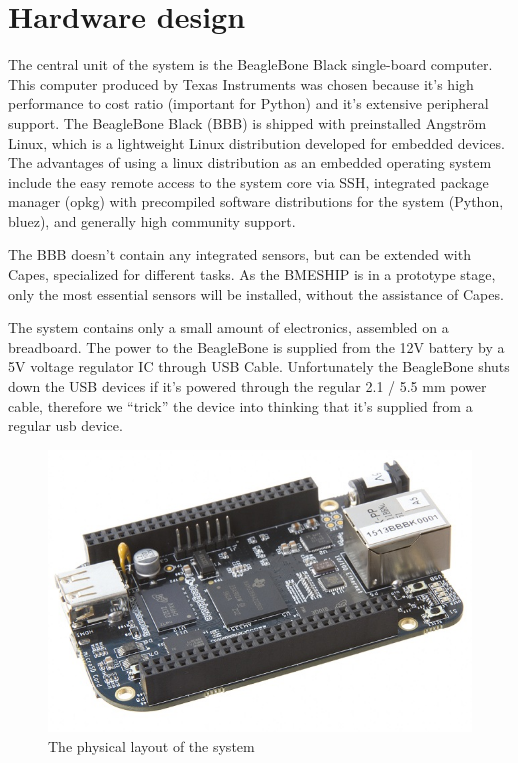 \section{Hardware design}

The central unit of the system is the BeagleBone Black single-board computer. This computer produced by Texas Instruments was chosen because it's high performance to cost ratio (important for Python) and it's extensive peripheral support.
The BeagleBone Black (BBB) is shipped with preinstalled Angström Linux, which is a lightweight Linux distribution developed for embedded devices. The advantages of using a linux distribution as an embedded operating system include the easy remote access to the system core via SSH, integrated package manager (opkg) with precompiled software distributions for the system (Python, bluez), and generally high community support.

The BBB doesn't contain any integrated sensors, but can be extended with Capes, specialized for different tasks. As the BMESHIP is in a prototype stage, only the most essential sensors will be installed, without the assistance of Capes.

The system contains only a small amount of electronics, assembled on a breadboard. The power to the BeagleBone is supplied from the 12V battery by a 5V voltage regulator IC through USB Cable.
Unfortunately the BeagleBone shuts down the USB devices if it’s powered through the regular 2.1 / 5.5 mm power cable, therefore we “trick” the device into thinking that it’s supplied from a regular usb device.

\begin{figure}[H]
	\centering
	\includegraphics[width=1\textwidth]{img2/BeagleBone}
	\caption{The physical layout of the system}
	\label{fig:PhysicalLayout}
\end{figure}

